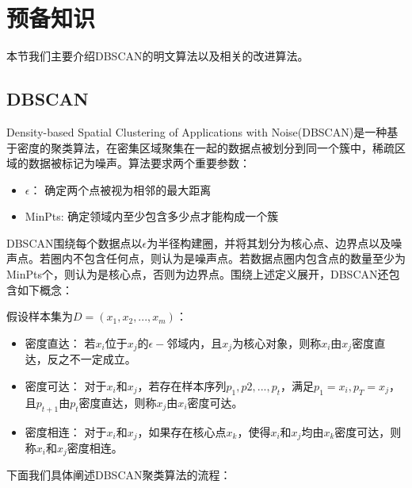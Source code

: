 \section{预备知识}
本节我们主要介绍DBSCAN的明文算法以及相关的改进算法。
\label{s4-yubei}
\subsection{DBSCAN}
Density-based Spatial Clustering of Applications with Noise(DBSCAN)是一种基于密度的聚类算法，在密集区域聚集在一起的数据点被划分到同一个簇中，稀疏区域的数据被标记为噪声\cite{khan2014dbscan}。算法要求两个重要参数：
\begin{itemize}
	\item $\epsilon$： 确定两个点被视为相邻的最大距离
	\item MinPts: 确定领域内至少包含多少点才能构成一个簇
\end{itemize}

DBSCAN围绕每个数据点以$\epsilon$为半径构建圈，并将其划分为核心点、边界点以及噪声点。若圈内不包含任何点，则认为是噪声点。若数据点圈内包含点的数量至少为MinPts个，则认为是核心点，否则为边界点。围绕上述定义展开，DBSCAN还包含如下概念：

假设样本集为$D=(x_1,x_2,...,x_m)$：
\begin{itemize}
	\item 密度直达： 若$ x_i $位于$ x_j $的$ \epsilon- $邻域内，且$ x_j $为核心对象，则称$ x_i $由$ x_j $密度直达，反之不一定成立。
	\item 密度可达： 对于$ x_i $和$ x_j $，若存在样本序列$ p_1,p2,...,p_t $，满足$ p_1=x_i,p_T=x_j $，且$ p_{t+1} $由$ p_t $密度直达，则称$ x_j $由$ x_i $密度可达。
	\item 密度相连： 对于$ x_i $和$ x_j $，如果存在核心点$ x_k $，使得$ x_i $和$ x_j $均由$ x_k $密度可达，则称$ x_i $和$ x_j $密度相连。
\end{itemize}


下面我们具体阐述DBSCAN聚类算法的流程：


